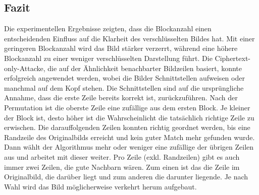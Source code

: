 \subsection{Fazit}
Die experimentellen Ergebnisse zeigten, dass die Blockanzahl einen entscheidenden Einfluss auf die 
Klarheit des verschlüsselten Bildes hat. Mit einer geringeren Blockanzahl wird das Bild stärker verzerrt, 
während eine höhere Blockanzahl zu einer weniger verschlüsselten Darstellung führt.
Die Ciphertext-only-Attacke, die auf der Ähnlichkeit benachbarter Bildzeilen basiert, 
konnte erfolgreich angewendet werden, wobei die Bilder Schnittstellen aufweisen oder manchmal auf dem Kopf stehen.
Die Schnittstellen sind auf die ursprüngliche Annahme, dass die erste Zeile bereits korrekt ist, zurückzuführen.
Nach der Permutation ist die oberste Zeile eine zufällige aus dem ersten Block. Je kleiner der Block ist,
desto höher ist die Wahrscheinlicht die tatsächlich richtige Zeile zu erwischen. Die darauffolgenden Zeilen
konnten richtig geordnet werden, bis eine Randzeile des Originalbilds erreicht und kein guter
Match mehr gefunden wurde. Dann wählt der Algorithmus mehr oder weniger eine zufällige der übrigen Zeilen
aus und arbeitet mit dieser weiter. Pro Zeile (exkl. Randzeilen) gibt es auch immer zwei Zeilen,
die gute Nachbarn wären. Zum einen ist das die Zeile im Originalbild, die darüber liegt und zum anderen
die darunter liegende. Je nach Wahl wird das Bild möglicherweise verkehrt herum aufgebaut.